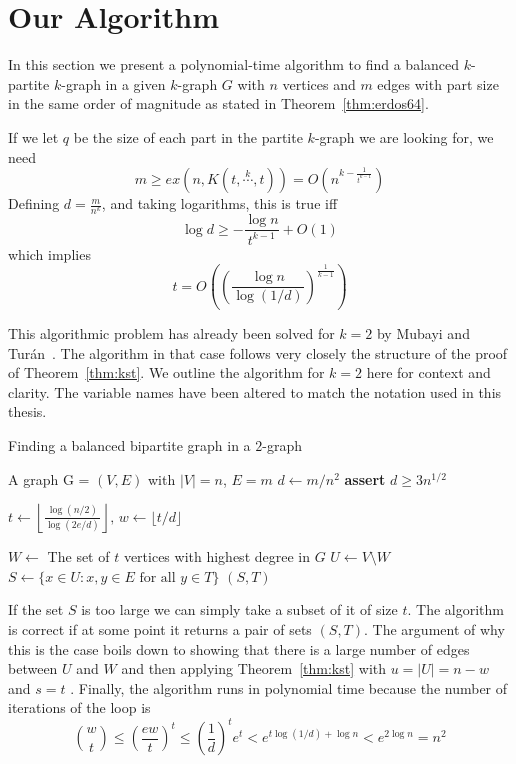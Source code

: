\section{Our Algorithm}\label{sec:algorithm}

In this section we present a polynomial-time algorithm to find a balanced $k$-partite
$k$-graph in a given $k$-graph $G$
with $n$ vertices and $m$ edges with part size in the same order of magnitude as stated in
Theorem~\ref{thm:erdos64}.

\begin{remark}
    If we let $q$ be the size of each part in the partite $k$-graph we are looking for, we need
    \[
        m \geq ex(n, K(t, \overset{k}{\cdots}, t)) = O\left(n^{k - \frac{1}{t^{k-1}}}\right)
    \]
    Defining $d = \frac{m}{n^k}$, and taking logarithms, this is true iff
    \[
        \log d \geq - \frac{\log n}{t^{k-1}} + O(1)
    \]
    which implies
    \[
        t = O\left(\left(\frac{\log n}{\log (1/d)}\right)^{\frac{1}{k-1}}\right)
    \]
\end{remark}

This algorithmic problem has already been solved for $k = 2$ by Mubayi and Turán~\cite{MUBAYI2010174}.
The algorithm in that case follows very closely the structure of the proof of Theorem~\ref{thm:kst}.
We outline the algorithm for $k = 2$ here for context and clarity.
The variable names have been altered to match the notation used in this thesis.

\begin{algorithm}
    \caption{Finding a balanced bipartite graph in a $2$-graph}
    \label{alg:bipartite}
        \begin{algorithmic}[1]
        \Require A graph G = $(V, E)$ with $|V| = n$, $E = m$
        \State $d \gets m / n^2 $
        \State \textbf{assert} $d \geq 3 n^{1/2}$

        \State $t \gets \left\lfloor\frac{\log (n/2) }
        {\log (2e/d)}\right\rfloor,\, w \gets \lfloor t/d \rfloor$

        \State $W \gets $ The set of $t$ vertices with highest degree in $G$
        \State $U \gets V \setminus W$
            \State $S \gets \{x \in U : {x, y} \in E \text{ for all } y \in T\}$
                \State \Return $(S, T)$
            \EndIf
        \EndFor
        \end{algorithmic}
\end{algorithm}

If the set $S$ is too large we can simply take a subset of it of size $t$.
The algorithm is correct if at some point it returns a pair of sets $(S, T)$.
The argument of why this is the case boils down to showing that there is a
large number of edges between $U$ and $W$ and then applying Theorem~\ref{thm:kst}
with $u = |U| = n - w$ and $s = t$ .
Finally, the algorithm runs in polynomial time because 
the  number of iterations of the loop is
\[
    \binom{w}{t} \leq
    \left(\frac{ew}{t}\right)^t \leq
    \left(\frac{1}{d}\right)^t e^t < e^{t \log (1/d) + \log n} <
    e^{2\log n} = n^2
\]

